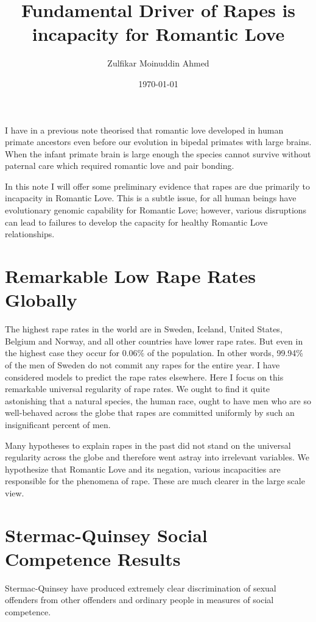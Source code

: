 \documentclass{amsart}
\title{Fundamental Driver of Rapes is incapacity for Romantic Love}
\author{Zulfikar Moinuddin Ahmed}
\date{\today}
\begin{document}
\maketitle

I have in a previous note theorised that romantic love developed in human primate ancestors even before our evolution in bipedal primates with large brains.  When the infant primate brain is large enough the species cannot survive without paternal care which required romantic love and pair bonding.  

In this note I will offer some preliminary evidence that rapes are due primarily to incapacity in Romantic Love.  This is a subtle issue, for all human beings have evolutionary genomic capability for Romantic Love; however, various disruptions can lead to failures to develop the capacity for healthy Romantic Love relationships.

\section{Remarkable Low Rape Rates Globally}
The highest rape rates in the world are in Sweden, Iceland, United States, Belgium and Norway, and all other countries have lower rape rates.  But even in the highest case they occur for 0.06\% of the population.  In other words, 99.94\% of the men of Sweden do not commit any rapes for the entire year.  I have considered models to predict the rape rates elsewhere.  Here I focus on this remarkable universal regularity of rape rates.  We ought to find it quite astonishing that a natural species, the human race, ought to have men who are so well-behaved across the globe that rapes are committed uniformly by such an insignificant percent of men.  

Many hypotheses to explain rapes in the past did not stand on the universal regularity across the globe and therefore went astray into irrelevant variables.  We hypothesize that Romantic Love and its negation, various incapacities are responsible for the phenomena of rape.  These are much clearer in the large scale view.

\section{Stermac-Quinsey Social Competence Results}

Stermac-Quinsey \cite{SQ} have produced extremely clear discrimination of sexual offenders from other offenders and ordinary people in measures of social competence.
\end{document}
